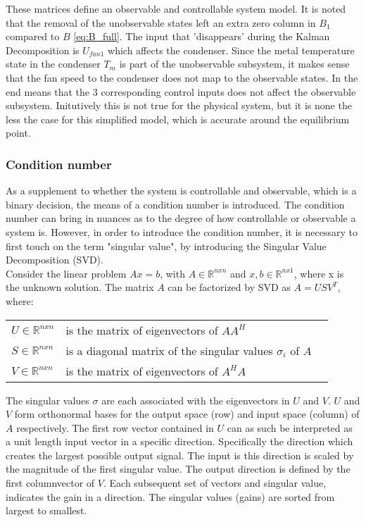 These matrices define an observable and controllable system model. It is noted that the removal of the unobservable states left an extra zero column in $B_1$ compared to $ B $ \cref{eq:B_full}. The input that 'disappears' during the Kalman Decomposition is $ U_{fan1} $ which affects the condenser. Since the metal temperature state in the condenser $ T_m $ is part of the unobservable subsystem, it makes sense that the fan speed to the condenser does not map to the observable states.
In the end means that the 3 corresponding control inputs does not affect the observable subsystem. Initutively this is not true for the physical system, but it is none the less the case for this simplified model, which is accurate around the equilibrium point.

\subsubsection{Condition number} \label{sec:condNumber}
As a supplement to whether the system is controllable and observable, which is a binary decision, the means of a condition number is introduced. The condition number can bring in nuances as to the degree of how controllable or observable a system is. However, in order to introduce the condition number, it is necessary to first touch on the term "singular value", by introducing the Singular Value Decomposition (SVD).\\

Consider the linear problem $Ax=b$, with $A \in \mathbb{R} ^{n x n}$ and $ x, b \in \mathbb{R} ^{n x 1}$, where x is the unknown solution. The matrix $A$ can be factorized by SVD as $A = USV^T$, where:
\begin{center}
	\begin{tabular}{l p{8cm} l}
		$U \in \mathbb{R} ^{n x n}$		& is the matrix of eigenvectors of $AA^H$  &  \\
		$S \in \mathbb{R} ^{n x n}$ 	& is a diagonal matrix of the singular values $\sigma_i$ of $A$ &  \\
		$V \in \mathbb{R} ^{n x n}$		& is the matrix of eigenvectors of $A^HA$  &  \\
	\end{tabular}
\end{center}

The singular values $\sigma$ are each associated with the eigenvectors in $U$ and $V$. $U$ and $V$ form orthonormal bases for the output space (row) and input space (column) of $A$ respectively. The first row vector contained in $U$ can as such be interpreted as a unit length input vector in a specific direction. Specifically the direction which creates the largest possible output signal. The input is this direction is scaled by the magnitude of the first singular value. The output direction is defined by the first columnvector of $V$. Each subsequent set of vectors and singular value, indicates the gain in a direction. The singular values (gains) are sorted from largest to smallest.

